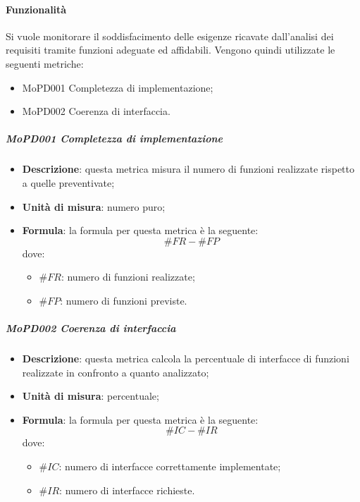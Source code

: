 \documentclass[../norme-di-progetto.tex]{subfiles}
\begin{document}
\paragraph{Funzionalità}
Si vuole monitorare il soddisfacimento delle esigenze ricavate dall'analisi dei requisiti tramite funzioni adeguate ed affidabili. Vengono quindi utilizzate le seguenti metriche:
\begin{itemize}
  \item MoPD001 Completezza di implementazione;
  \item MoPD002 Coerenza di interfaccia.
\end{itemize}
\subparagraph{MoPD001 Completezza di implementazione}
\begin{itemize}
  \item \textbf{Descrizione}: questa metrica misura il numero di funzioni realizzate rispetto a quelle preventivate;
  \item \textbf{Unità di misura}: numero puro;
  \item \textbf{Formula}: la formula per questa metrica è la seguente:
  \begin{displaymath}
    \#FR - \#FP
  \end{displaymath}
  dove:
  \begin{itemize}
    \item $ \#FR $: numero di funzioni realizzate;
    \item $ \#FP $: numero di funzioni previste.
  \end{itemize}
\end{itemize}
\subparagraph{MoPD002 Coerenza di interfaccia}
\begin{itemize}
  \item \textbf{Descrizione}: questa metrica calcola la percentuale di interfacce di funzioni realizzate in confronto a quanto analizzato;
  \item \textbf{Unità di misura}: percentuale;
  \item \textbf{Formula}: la formula per questa metrica è la seguente:
  \begin{displaymath}
    \#IC - \#IR
  \end{displaymath}
  dove:
  \begin{itemize}
    \item $ \#IC $: numero di interfacce correttamente implementate;
    \item $ \#IR $: numero di interfacce richieste.
  \end{itemize}
\end{itemize}
\end{document}
